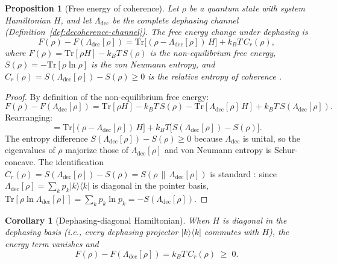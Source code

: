 \documentclass[12pt,a4paper]{article}
\newtheorem{proposition}[theorem]{Proposition}
\newtheorem{corollary}[theorem]{Corollary}
\theoremstyle{definition}
\theoremstyle{remark}
\begin{document}
\begin{proposition}[Free energy of coherence]
\label{prop:free-energy-coherence}
Let $\rho$ be a quantum state with system Hamiltonian $H$, and let $\Lambda_{\mathrm{dec}}$ be the complete dephasing channel \emph{(Definition~\ref{def:decoherence-channel})}.  The free energy change under dephasing is
\begin{equation}
\label{eq:free-energy-general}
F(\rho) - F(\Lambda_{\mathrm{dec}}[\rho]) = \mathrm{Tr}\bigl[(\rho - \Lambda_{\mathrm{dec}}[\rho])\, H\bigr] + k_B T\, C_r(\rho),
\end{equation}
where $F(\rho) = \mathrm{Tr}[\rho H] - k_B T\, S(\rho)$ is the non-equilibrium free energy, $S(\rho) = -\mathrm{Tr}[\rho \ln \rho]$ is the von Neumann entropy, and $C_r(\rho) = S(\Lambda_{\mathrm{dec}}[\rho]) - S(\rho) \geq 0$ is the relative entropy of coherence \cite{streltsov2017colloquium}.
\end{proposition}

\begin{proof}
By definition of the non-equilibrium free energy:
\[
F(\rho) - F(\Lambda_{\mathrm{dec}}[\rho]) = \mathrm{Tr}[\rho H] - k_B T\, S(\rho) - \mathrm{Tr}[\Lambda_{\mathrm{dec}}[\rho]\, H] + k_B T\, S(\Lambda_{\mathrm{dec}}[\rho]).
\]
Rearranging:
\[
= \mathrm{Tr}\bigl[(\rho - \Lambda_{\mathrm{dec}}[\rho])\, H\bigr] + k_B T \bigl[S(\Lambda_{\mathrm{dec}}[\rho]) - S(\rho)\bigr].
\]
The entropy difference $S(\Lambda_{\mathrm{dec}}[\rho]) - S(\rho) \geq 0$ because $\Lambda_{\mathrm{dec}}$ is unital, so the eigenvalues of $\rho$ majorize those of $\Lambda_{\mathrm{dec}}[\rho]$ and von Neumann entropy is Schur-concave.  The identification $C_r(\rho) = S(\Lambda_{\mathrm{dec}}[\rho]) - S(\rho) = S(\rho \,\|\, \Lambda_{\mathrm{dec}}[\rho])$ is standard \cite{streltsov2017colloquium}: since $\Lambda_{\mathrm{dec}}[\rho] = \sum_k p_k |k\rangle\langle k|$ is diagonal in the pointer basis, $\mathrm{Tr}[\rho \ln \Lambda_{\mathrm{dec}}[\rho]] = \sum_k p_k \ln p_k = -S(\Lambda_{\mathrm{dec}}[\rho])$.
\end{proof}

\begin{corollary}[Dephasing-diagonal Hamiltonian]
\label{cor:diagonal-hamiltonian}
When $H$ is diagonal in the dephasing basis (i.e., every dephasing projector $|k\rangle\langle k|$ commutes with $H$), the energy term vanishes and
\begin{equation}
\label{eq:free-energy-diagonal-H}
F(\rho) - F(\Lambda_{\mathrm{dec}}[\rho]) = k_B T\, C_r(\rho) \;\geq\; 0.
\end{equation}
\end{corollary}
\end{document}
